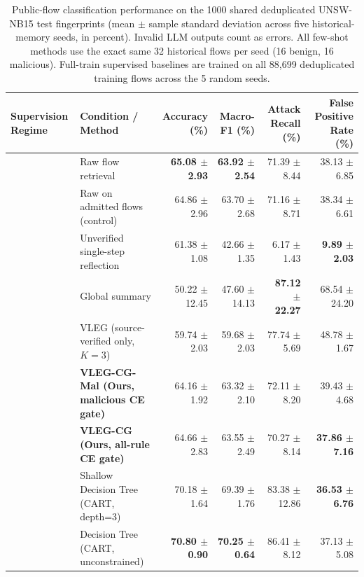 \documentclass[10pt,a4paper,onecolumn]{article}
\theoremstyle{definition}
\theoremstyle{remark}
\begin{document}
\begin{table}[!t]
\centering
\caption{Public-flow classification performance on the 1000 shared deduplicated UNSW-NB15 test fingerprints (mean $\pm$ sample standard deviation across five historical-memory seeds, in percent). Invalid LLM outputs count as errors. All few-shot methods use the exact same 32 historical flows per seed (16 benign, 16 malicious). Full-train supervised baselines are trained on all 88,699 deduplicated training flows across the 5 random seeds.}
\label{tab:exp6_performance}
\small
\begin{adjustbox}{max width=\linewidth}
\begin{tabular}{llrrrr}
\toprule
\textbf{Supervision Regime} & \textbf{Condition / Method} & \textbf{Accuracy (\%)} & \textbf{Macro-F1 (\%)} & \textbf{Attack Recall (\%)} & \textbf{False Positive Rate (\%)} \\
\midrule
{}
 & Raw flow retrieval & \textbf{65.08 $\pm$ 2.93} & \textbf{63.92 $\pm$ 2.54} & 71.39 $\pm$ 8.44 & 38.13 $\pm$ 6.85 \\
 & Raw on admitted flows (control) & 64.86 $\pm$ 2.96 & 63.70 $\pm$ 2.68 & 71.16 $\pm$ 8.71 & 38.34 $\pm$ 6.61 \\
 & Unverified single-step reflection & 61.38 $\pm$ 1.08 & 42.66 $\pm$ 1.35 & 6.17 $\pm$ 1.43 & \textbf{9.89 $\pm$ 2.03} \\
 & Global summary & 50.22 $\pm$ 12.45 & 47.60 $\pm$ 14.13 & \textbf{87.12 $\pm$ 22.27} & 68.54 $\pm$ 24.20 \\
 & VLEG (source-verified only, $K{=}3$) & 59.74 $\pm$ 2.03 & 59.68 $\pm$ 2.03 & 77.74 $\pm$ 5.69 & 48.78 $\pm$ 1.67 \\
 & \textbf{VLEG-CG-Mal (Ours, malicious CE gate)} & 64.16 $\pm$ 1.92 & 63.32 $\pm$ 2.10 & 72.11 $\pm$ 8.20 & 39.43 $\pm$ 4.68 \\
 & \textbf{VLEG-CG (Ours, all-rule CE gate)} & 64.66 $\pm$ 2.83 & 63.55 $\pm$ 2.49 & 70.27 $\pm$ 8.14 & \textbf{37.86 $\pm$ 7.16} \\
\midrule
{}
 & Shallow Decision Tree (CART, depth=3) & 70.18 $\pm$ 1.64 & 69.39 $\pm$ 1.76 & 83.38 $\pm$ 12.86 & \textbf{36.53 $\pm$ 6.76} \\
 & Decision Tree (CART, unconstrained) & \textbf{70.80 $\pm$ 0.90} & \textbf{70.25 $\pm$ 0.64} & 86.41 $\pm$ 8.12 & 37.13 $\pm$ 5.08 \\

\end{tabular}
\end{adjustbox}
\end{table}
\end{document}
